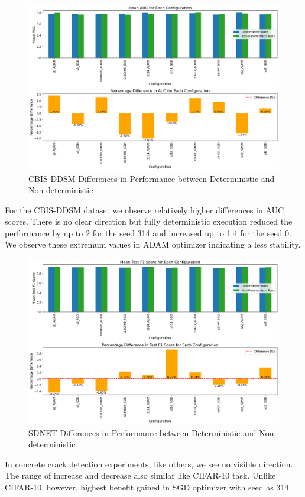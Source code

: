 \begin{figure}[h!]
      \centering
      \includegraphics[width=1\textwidth]{figures/mammo_performance.png}
      \caption{CBIS-DDSM Differences in Performance between Deterministic and Non-deterministic}
      \label{fig:cbisddsm_dif_per}
\end{figure}

For the CBIS-DDSM dataset we observe relatively higher differences in AUC scores. There is no clear direction but fully deterministic execution reduced the performance by up to 2 for the seed 314 and increased up to 1.4 for the seed 0.
We observe these extremum values in ADAM optimizer indicating a less stability.\\

\begin{figure}[h!]
      \centering
      \includegraphics[width=1\textwidth]{figures/crack_performance.png}
      \caption{SDNET Differences in Performance between Deterministic and Non-deterministic}
      \label{fig:sdnet_dif_per}
\end{figure}
In concrete crack detection experiments, like others, we see no visible direction. The range of increase and decrease also similar like CIFAR-10 task. Unlike CIFAR-10, however, highest benefit gained in SGD optimizer with seed as 314. 

